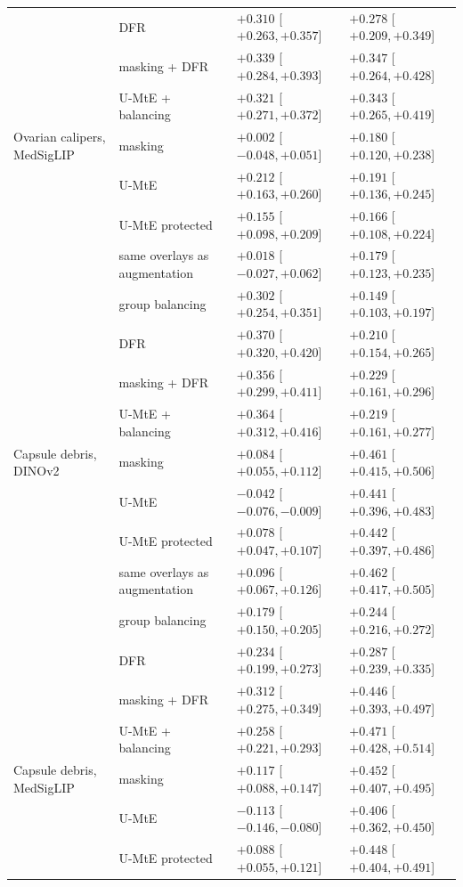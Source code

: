 {\begin{longtable}{p{3.4cm}p{4.2cm}p{3.5cm}p{3.5cm}}
 & DFR & $+0.310$ [$+0.263, +0.357$] & $+0.278$ [$+0.209, +0.349$] \\
 & masking + DFR & $+0.339$ [$+0.284, +0.393$] & $+0.347$ [$+0.264, +0.428$] \\
 & U-MtE + balancing & $+0.321$ [$+0.271, +0.372$] & $+0.343$ [$+0.265, +0.419$] \\
Ovarian calipers, MedSigLIP & masking & $+0.002$ [$-0.048, +0.051$] & $+0.180$ [$+0.120, +0.238$] \\
 & U-MtE & $+0.212$ [$+0.163, +0.260$] & $+0.191$ [$+0.136, +0.245$] \\
 & U-MtE protected & $+0.155$ [$+0.098, +0.209$] & $+0.166$ [$+0.108, +0.224$] \\
 & same overlays as augmentation & $+0.018$ [$-0.027, +0.062$] & $+0.179$ [$+0.123, +0.235$] \\
 & group balancing & $+0.302$ [$+0.254, +0.351$] & $+0.149$ [$+0.103, +0.197$] \\
 & DFR & $+0.370$ [$+0.320, +0.420$] & $+0.210$ [$+0.154, +0.265$] \\
 & masking + DFR & $+0.356$ [$+0.299, +0.411$] & $+0.229$ [$+0.161, +0.296$] \\
 & U-MtE + balancing & $+0.364$ [$+0.312, +0.416$] & $+0.219$ [$+0.161, +0.277$] \\
Capsule debris, DINOv2 & masking & $+0.084$ [$+0.055, +0.112$] & $+0.461$ [$+0.415, +0.506$] \\
 & U-MtE & $-0.042$ [$-0.076, -0.009$] & $+0.441$ [$+0.396, +0.483$] \\
 & U-MtE protected & $+0.078$ [$+0.047, +0.107$] & $+0.442$ [$+0.397, +0.486$] \\
 & same overlays as augmentation & $+0.096$ [$+0.067, +0.126$] & $+0.462$ [$+0.417, +0.505$] \\
 & group balancing & $+0.179$ [$+0.150, +0.205$] & $+0.244$ [$+0.216, +0.272$] \\
 & DFR & $+0.234$ [$+0.199, +0.273$] & $+0.287$ [$+0.239, +0.335$] \\
 & masking + DFR & $+0.312$ [$+0.275, +0.349$] & $+0.446$ [$+0.393, +0.497$] \\
 & U-MtE + balancing & $+0.258$ [$+0.221, +0.293$] & $+0.471$ [$+0.428, +0.514$] \\
Capsule debris, MedSigLIP & masking & $+0.117$ [$+0.088, +0.147$] & $+0.452$ [$+0.407, +0.495$] \\
 & U-MtE & $-0.113$ [$-0.146, -0.080$] & $+0.406$ [$+0.362, +0.450$] \\
 & U-MtE protected & $+0.088$ [$+0.055, +0.121$] & $+0.448$ [$+0.404, +0.491$] \\

\end{longtable}}
